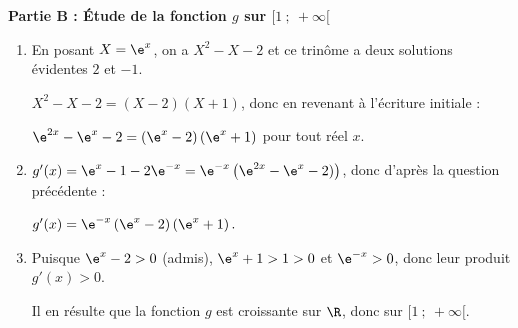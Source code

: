\textbf{Partie B : Étude de la fonction $g$ sur $[1~;~+\infty[$}

\medskip

\begin{enumerate}
\item 


En posant $X = \e^x$, on a $X^2 - X - 2$ et ce trinôme a deux solutions évidentes $2$ et $- 1$.

$X^2 - X - 2 = (X - 2)(X + 1)$, donc en revenant à l'écriture initiale :

$\e^{2x} - \e^x - 2 = \left(\e^x - 2\right)\left(\e^x + 1\right)$ pour tout réel $x$.
\item 
$g'(x) = \e^x - 1 - 2\e^{-x} = \e^{-x}\left(\e^{2x} - \e^{x} - 2)\right)$, donc d'après la question précédente :

$g'(x) = \e^{-x}\left(\e^x - 2\right)\left(\e^x + 1\right).$
\item 
Puisque $\e^x - 2 > 0$ (admis), $\e^x + 1 > 1 > 0$  et $\e^{-x} > 0$, donc leur produit $g'(x) > 0$.

Il en résulte que la fonction $g$ est croissante sur $\R$, donc sur $[1~;~ +\infty[$.

\end{enumerate}
